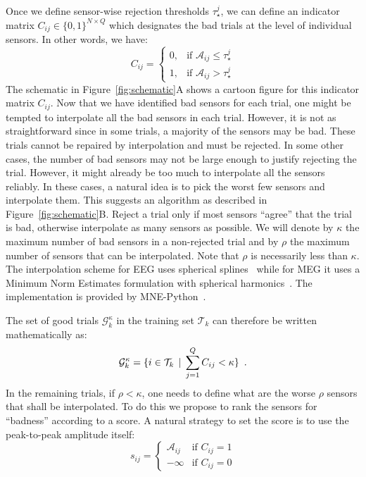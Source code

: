 Once we define sensor-wise rejection thresholds $\tau_{\star}^{j}$, we can define an indicator matrix $C_{ij} \in \{0, 1\}^{N \times Q}$ which designates the bad trials at the level of individual sensors. In other words, we have:
\begin{equation}
C_{ij} = \begin{cases} 
0, & \text{if } \mathcal{A}_{ij} \leq \tau^{j}_{\star} \\
1, & \text{if } \mathcal{A}_{ij} > \tau^{j}_{\star}
\end{cases}
\end{equation}
The schematic in Figure~\ref{fig:schematic}A shows a cartoon figure for this indicator matrix $C_{ij}$. Now that we have identified bad sensors for each trial, one might be tempted to interpolate all the bad sensors in each trial. However, it is not as straightforward since in some trials, a majority of the sensors may be bad. These trials cannot be repaired by interpolation and must be rejected. In some other cases, the number of bad sensors may not be large enough to justify rejecting the trial. However, it might already be too much to interpolate all the sensors reliably. In these cases, a natural idea is to pick the worst few sensors and interpolate them. This suggests an algorithm as described in Figure~\ref{fig:schematic}B. Reject a trial only if most sensors ``agree'' that the trial is bad, otherwise interpolate as many sensors as possible. We will denote by $\kappa$ the maximum number of bad sensors in a non-rejected trial and by $\rho$ the maximum number of sensors that can be interpolated. Note that $\rho$ is necessarily less than $\kappa$. The interpolation scheme for EEG uses spherical splines~\citep{perrin1989spherical} while for MEG it uses a Minimum Norm Estimates formulation with spherical harmonics~\citep{hamalainen1994interpreting}. The implementation is provided by MNE-Python~\citep{gramfort2013meg}.

The set of good trials $\mathcal{G}^{\kappa}_k$ in the training set $\mathcal{T}_k$ can therefore be written mathematically as:
%
\begin{equation}
\mathcal{G}^{\kappa}_{k} = \{i \in \mathcal{T}_k \, \mid \, \sum_{j=1}^{Q} C_{ij} < \kappa \} \enspace .
\end{equation}
%
In the remaining trials, if $\rho < \kappa$, one needs to define what are the worse $\rho$ sensors that shall be interpolated. To do this we propose to rank the sensors for ``badness'' according to a score. A natural strategy to set the score is to use the peak-to-peak amplitude itself:
%
\begin{equation}
s_{ij} = \begin{cases}
\mathcal{A}_{ij} & \text{if } C_{ij} = 1 \\
-\infty & \text{if } C_{ij} = 0
\end{cases}
\label{eq:score}
\end{equation}

